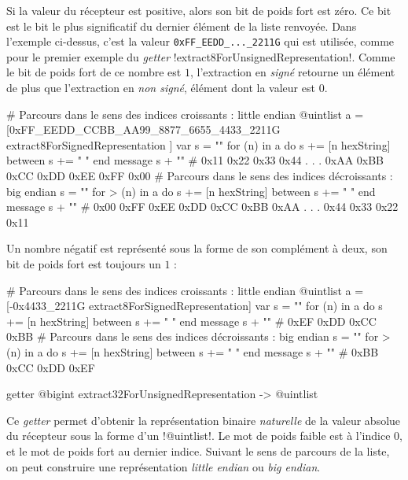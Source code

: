Si la valeur du récepteur est positive, alors son bit de poids fort est zéro. Ce bit est le bit le plus significatif du dernier élément de la liste renvoyée. Dans l'exemple ci-dessus, c'est la valeur \texttt{0xFF\_EEDD\_...\_2211G} qui est utilisée, comme pour le premier exemple du \emph{getter} \ggs!extract8ForUnsignedRepresentation!. Comme le bit de poids fort de ce nombre est $1$, l'extraction en \emph{signé} retourne un élément de plus que l'extraction en \emph{non signé}, élément dont la valeur est $0$.

\begin{galgas}
# Parcours dans le sens des indices croissants : little endian
@uintlist a = [0xFF_EEDD_CCBB_AA99_8877_6655_4433_2211G
  extract8ForSignedRepresentation
]
var s = ""
for (n) in a
  do s += [n hexString]
  between s += " "
end
message s + "\n" # 0x11 0x22 0x33 0x44 . . . 0xAA 0xBB 0xCC 0xDD 0xEE 0xFF 0x00
# Parcours dans le sens des indices décroissants : big endian
s = ""
for > (n) in a
  do s += [n hexString]
  between s += " "
end
message s + "\n" # 0x00 0xFF 0xEE 0xDD 0xCC 0xBB 0xAA . . . 0x44 0x33 0x22 0x11
\end{galgas}

Un nombre négatif est représenté sous la forme de son complément à deux, son bit de poids fort est toujours un $1$ : 

\begin{galgas}
# Parcours dans le sens des indices croissants : little endian
@uintlist a = [-0x4433_2211G extract8ForSignedRepresentation]
var s = ""
for (n) in a
  do s += [n hexString]
  between s += " "
end
message s + "\n" # 0xEF 0xDD 0xCC 0xBB
# Parcours dans le sens des indices décroissants : big endian
s = ""
for > (n) in a
  do s += [n hexString]
  between s += " "
end
message s + "\n" # 0xBB 0xCC 0xDD 0xEF
\end{galgas}


\begin{galgasbox}
getter @bigint extract32ForUnsignedRepresentation -> @uintlist
\end{galgasbox}

Ce \emph{getter} permet d'obtenir la représentation binaire \emph{naturelle} de la valeur absolue du récepteur sous la forme d'un \ggs!@uintlist!. Le mot de poids faible est à l'indice $0$, et le mot de poids fort au dernier indice. Suivant le sens de parcours de la liste, on peut construire une représentation \emph{little endian} ou \emph{big endian}.

